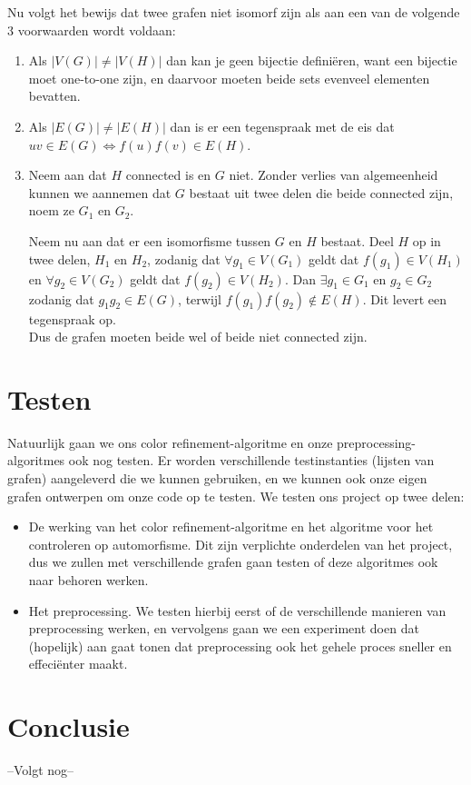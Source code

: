 \documentclass{article}
\begin{document}
Nu volgt het bewijs dat twee grafen niet isomorf zijn als aan een van de volgende 3 voorwaarden wordt voldaan:
\begin{enumerate}
\item Als $|V(G)|\neq|V(H)|$ dan kan je geen bijectie defini\"eren, want een bijectie moet one-to-one zijn, en daarvoor moeten beide sets evenveel elementen bevatten.
\item Als $|E(G)|\neq|E(H)|$ dan is er een tegenspraak met de eis dat $uv\in E(G)\Leftrightarrow f(u)f(v)\in E(H)$.
\item Neem aan dat $H$ connected is en $G$ niet. Zonder verlies van algemeenheid kunnen we aannemen dat $G$ bestaat uit twee delen die beide connected zijn, noem ze $G_1$ en $G_2$.

Neem nu aan dat er een isomorfisme tussen $G$ en $H$ bestaat. Deel $H$ op in twee delen, $H_1$ en $H_2$, zodanig dat $\forall g_1\in V(G_1)$ geldt dat $f(g_1)\in V(H_1)$ en $\forall g_2\in V(G_2)$ geldt dat $f(g_2)\in V(H_2)$.
Dan $\exists g_1\in G_1$ en $g_2\in G_2$ zodanig dat $g_1g_2\in E(G)$, terwijl $f(g_1)f(g_2)\notin E(H)$. Dit levert een tegenspraak op.\\
Dus de grafen moeten beide wel of beide niet connected zijn.
\end{enumerate}

\pagebreak


\section{Testen}
Natuurlijk gaan we ons color refinement-algoritme en onze preprocessing-algoritmes ook nog testen. Er worden verschillende testinstanties (lijsten van grafen) aangeleverd die we kunnen gebruiken, en we kunnen ook onze eigen grafen ontwerpen om onze code op te testen. We testen ons project op twee delen:
\begin{itemize}
\item De werking van het color refinement-algoritme en het algoritme voor het controleren op automorfisme. Dit zijn verplichte onderdelen van het project, dus we zullen met verschillende grafen gaan testen of deze algoritmes ook naar behoren werken.
\item Het preprocessing. We testen hierbij eerst of de verschillende manieren van preprocessing werken, en vervolgens gaan we een experiment doen dat (hopelijk) aan gaat tonen dat preprocessing ook het gehele proces sneller en effeci\"enter maakt.
\end{itemize}
\pagebreak


\section{Conclusie}
--Volgt nog--
\pagebreak
\end{document}
